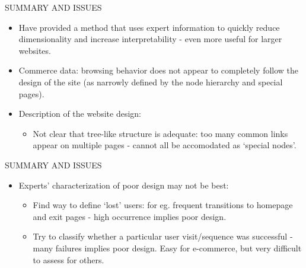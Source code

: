 \documentclass{report}
\newcommand{\head}[1]
{
  \begin{center}
      {\huge {\color{blue} #1}}
    \end{center}
  }
\begin{document}
\newpage \head{SUMMARY AND ISSUES}
\begin{itemize}
\item Have provided a method that uses expert information to quickly
  reduce dimensionality and increase interpretability -
  even more useful for larger websites.
\item Commerce data: browsing behavior does not appear to completely follow the
  design of the site (as narrowly defined by the node hierarchy and
  special pages).
\item Description of the website design:
\begin{itemize}
\item Not clear that tree-like structure is adequate: too many
  common links appear on multiple pages - cannot all be accomodated as
  `special nodes'.
\end{itemize}
\end{itemize}

\newpage \head{SUMMARY AND ISSUES}
\begin{itemize}
\item Experts' characterization of poor design may not be best:
\begin{itemize}
\item Find way to define `lost' users: for eg. frequent transitions
  to homepage and exit pages - high occurrence implies poor design.
\item Try to classify whether a particular user visit/sequence was
  successful - many failures implies poor design. Easy for e-commerce,
  but very difficult to assess for others.
\end{itemize}
\end{itemize}
\end{document}
